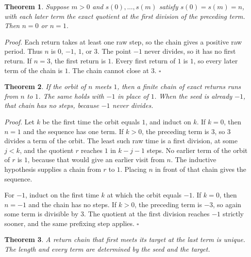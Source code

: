\documentclass[11pt,letterpaper]{article}
\newtheorem{theorem}{Theorem}
\newenvironment{proof}{\noindent\textit{Proof.}}{\hfill\(\square\)}
\begin{document}
\begin{theorem}
\label{thm:returnchain}
Suppose \(m>0\) and \(s(0),\ldots,s(m)\) satisfy \(s(0)=s(m)=n\), with each later term the exact quotient at the first division of the preceding term. Then \(n=0\) or \(n=1\).
\end{theorem}

\begin{proof}
Each return takes at least one raw step, so the chain gives a positive raw period. Thus \(n\) is \(0\), \(-1\), \(1\), or \(3\). The point \(-1\) never divides, so it has no first return. If \(n=3\), the first return is \(1\). Every first return of \(1\) is \(1\), so every later term of the chain is \(1\). The chain cannot close at \(3\).
\end{proof}

\begin{theorem}
\label{thm:chaintoone}
If the orbit of \(n\) meets \(1\), then a finite chain of exact returns runs from \(n\) to \(1\). The same holds with \(-1\) in place of \(1\). When the seed is already \(-1\), that chain has no steps, because \(-1\) never divides.
\end{theorem}

\begin{proof}
Let \(k\) be the first time the orbit equals \(1\), and induct on \(k\). If \(k=0\), then \(n=1\) and the sequence has one term. If \(k>0\), the preceding term is \(3\), so \(3\) divides a term of the orbit. The least such raw time is a first division, at some \(j<k\), and the quotient \(r\) reaches \(1\) in \(k-j-1\) steps. No earlier term of the orbit of \(r\) is \(1\), because that would give an earlier visit from \(n\). The inductive hypothesis supplies a chain from \(r\) to \(1\). Placing \(n\) in front of that chain gives the sequence.

For \(-1\), induct on the first time \(k\) at which the orbit equals \(-1\). If \(k=0\), then \(n=-1\) and the chain has no steps. If \(k>0\), the preceding term is \(-3\), so again some term is divisible by \(3\). The quotient at the first division reaches \(-1\) strictly sooner, and the same prefixing step applies.
\end{proof}

\begin{theorem}
\label{thm:chainunique}
A return chain that first meets its target at the last term is unique. The length and every term are determined by the seed and the target.
\end{theorem}
\end{document}
